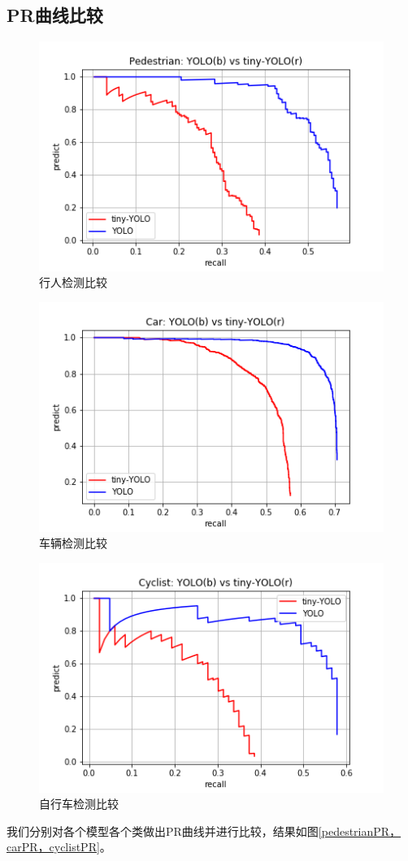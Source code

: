 {	\subsection{PR曲线比较}
	\begin{figure}[htbp]
	\centering
	\includegraphics[width=5in]{images/pedestrianPR.png}
	\caption{行人检测比较}
	\label{pedestrianPR}
	\end{figure}
	\begin{figure}[htbp]
	\centering
	\includegraphics[width=5in]{images/carPR.png}
	\caption{车辆检测比较}
	\label{carPR}
	\end{figure}
	\begin{figure}[htbp]
	\centering
	\includegraphics[width=5in]{images/cyclistPR.png}
	\caption{自行车检测比较}
	\label{cyclistPR}
	\end{figure}
	我们分别对各个模型各个类做出PR曲线并进行比较，结果如图\ref{pedestrianPR，carPR，cyclistPR}。

}
